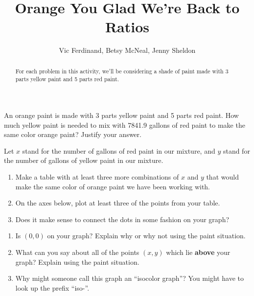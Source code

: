 \documentclass[nooutcomes]{ximera}
\title{Orange You Glad We're Back to Ratios}
\author{Vic Ferdinand, Betsy McNeal, Jenny Sheldon}
\begin{document}
\begin{abstract}
For each problem in this activity, we'll be considering a shade of paint made with 3 parts yellow paint and 5 parts red paint. 
\end{abstract}
\maketitle



\begin{problem} \label{Orange1}
 An orange paint is made with 3 parts yellow paint and 5 parts red paint.  How much yellow paint is needed to mix with 7841.9 gallons of red paint to make the same color orange paint?  Justify your answer.

\end{problem}
 
 
 

\begin{problem} \label{Orange2}
Let $x$ stand for the number of gallons of red paint in our mixture, and $y$ stand for the number of gallons of yellow paint in our mixture.
\begin{enumerate}
    \item Make a table with at least three more combinations of $x$ and $y$ that would make the same color of orange paint we have been working with.
    \item On the axes below, plot at least three of the points from your table.
    \item Does it make sense to connect the dots in some fashion on your graph?
\end{enumerate}


\begin{center}
\end{center}
\end{problem}





\begin{problem} \label{Orange3}
\begin{enumerate}
    \item Is $(0,0)$ on your graph?  Explain why or why not using the paint situation.
    \item What can you say about all of the points $(x,y)$ which lie {\bf above} your graph?  Explain using the paint situation.
    \item Why might someone call this graph an ``isocolor graph''?  You might have to look up the prefix ``iso-''.
\end{enumerate}
\end{problem}
\end{document}

